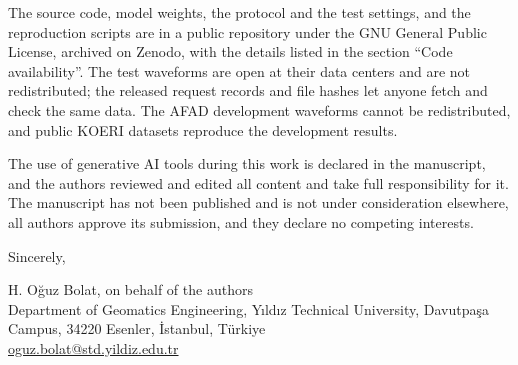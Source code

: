 \medskip
The source code, model weights, the protocol and the test settings, and the reproduction
scripts are in a public repository under the GNU General Public License, archived on
Zenodo, with the details listed in the section ``Code availability''. The test
waveforms are open at their data centers and are not redistributed; the released
request records and file hashes let anyone fetch and check the same data. The AFAD
development waveforms cannot be redistributed, and public KOERI datasets reproduce the
development results.

\medskip
The use of generative AI tools during this work is declared in the manuscript, and the
authors reviewed and edited all content and take full responsibility for it. The
manuscript has not been published and is not under consideration elsewhere, all
authors approve its submission, and they declare no competing interests.

\medskip
Sincerely,

\medskip
H. O\u{g}uz Bolat, on behalf of the authors\\
Department of Geomatics Engineering, Y\i{}ld\i{}z Technical University, Davutpa\c{s}a
Campus, 34220 Esenler, \.Istanbul, T\"urkiye\\
\href{mailto:oguz.bolat@std.yildiz.edu.tr}{oguz.bolat@std.yildiz.edu.tr}
